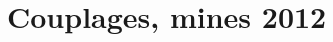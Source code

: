
\usepackage{enumitem}
\def\numero{03}
\def\classe{Option info MP1}

\camltrue

\chapter{Couplages, mines 2012}

